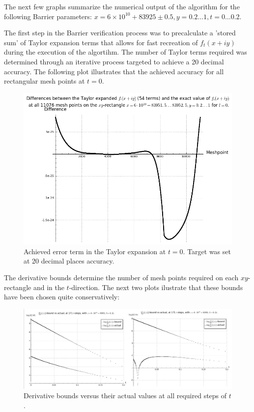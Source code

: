 The next few graphs summarize the numerical output of the algorithm for the following Barrier parameters: $x=6\times 10^{10}+83925 \pm 0.5, y = 0.2 \dots 1, t=0 \dots 0.2$.  


The first step in the Barrier verification process was to precalculate a 'stored sum' of Taylor expansion terms that allows for fast recreation of $f_t(x+iy)$ during the execution of the algortihm. The number of Taylor terms required was determined through an iterative process targeted to achieve a 20 decimal accuracy.  The following plot illustrates that the achieved accuracy for all rectangular mesh points at $t=0$.

\begin{figure}[h!]
  \includegraphics[width=0.7\linewidth]{BarrieraccuracyTaylor}
  \caption{Achieved error term in the Taylor expansion at $t=0$. Target was set at 20 decimal places accuracy.}
\end{figure}

The derivative bounds determine the number of mesh points required on each $xy$-rectangle and in the $t$-direction. The next two plots ilustrate that these bounds have been chosen quite conservatively:

\begin{figure}[h!]
  \includegraphics[width=1.0\linewidth]{Derivativebounds}
  \caption{Derivative bounds versus their actual values at all required steps of $t$.}
\end{figure}

